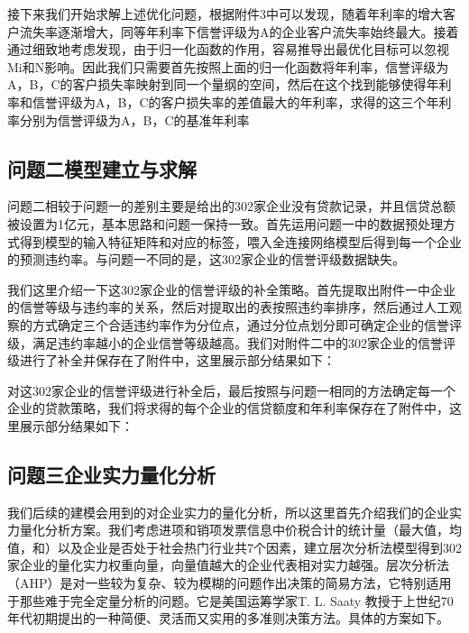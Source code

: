\documentclass{cumcmthesis}
\begin{document}
接下来我们开始求解上述优化问题，根据附件3中可以发现，随着年利率的增大客户流失率逐渐增大，同等年利率下信誉评级为A的企业客户流失率始终最大。接着通过细致地考虑发现，由于归一化函数的作用，容易推导出最优化目标可以忽视Mi和N影响。因此我们只需要首先按照上面的归一化函数将年利率，信誉评级为A，B，C的客户损失率映射到同一个量纲的空间，然后在这个找到能够使得年利率和信誉评级为A，B，C的客户损失率的差值最大的年利率，求得的这三个年利率分别为信誉评级为A，B，C的基准年利率


\subsection{问题二模型建立与求解}
问题二相较于问题一的差别主要是给出的302家企业没有贷款记录，并且信贷总额被设置为1亿元，基本思路和问题一保持一致。首先运用问题一中的数据预处理方式得到模型的输入特征矩阵和对应的标签，喂入全连接网络模型后得到每一个企业的预测违约率。与问题一不同的是，这302家企业的信誉评级数据缺失。

我们这里介绍一下这302家企业的信誉评级的补全策略。首先提取出附件一中企业的信誉等级与违约率的关系，然后对提取出的表按照违约率排序，然后通过人工观察的方式确定三个合适违约率作为分位点，通过分位点划分即可确定企业的信誉评级，满足违约率越小的企业信誉等级越高。我们对附件二中的302家企业的信誉评级进行了补全并保存在了附件中，这里展示部分结果如下：

对这302家企业的信誉评级进行补全后，最后按照与问题一相同的方法确定每一个企业的贷款策略，我们将求得的每个企业的信贷额度和年利率保存在了附件中，这里展示部分结果如下：

\subsection{问题三企业实力量化分析}
我们后续的建模会用到的对企业实力的量化分析，所以这里首先介绍我们的企业实力量化分析方案。我们考虑进项和销项发票信息中价税合计的统计量（最大值，均值，和）以及企业是否处于社会热门行业共7个因素，建立层次分析法模型得到302家企业的量化实力权重向量，向量值越大的企业代表相对实力越强。层次分析法（AHP）是对一些较为复杂、较为模糊的问题作出决策的简易方法，它特别适用于那些难于完全定量分析的问题。它是美国运筹学家T. L. Saaty 教授于上世纪70 年代初期提出的一种简便、灵活而又实用的多准则决策方法。具体的方案如下。
\end{document}
